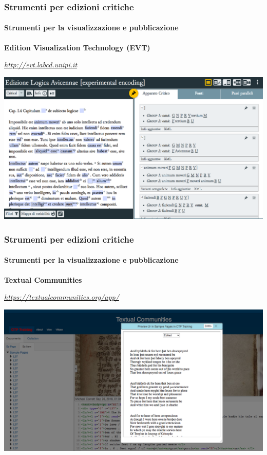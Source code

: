 \begin{frame}
    \frametitle{Strumenti per edizioni critiche}
    \framesubtitle{Strumenti per la visualizzazione e pubblicazione}
	\addtocounter{nframe}{1}
    \begin{center}
        \textbf{Edition Visualization Technology (EVT)}
    \end{center}
    \begin{center}
        \textit{\url{http://evt.labcd.unipi.it}}
	\end{center}
    \begin{center}
        \includegraphics[width=.95\textwidth]{imgs/evt.png}
	\end{center}
\end{frame}

\begin{frame}
    \frametitle{Strumenti per edizioni critiche}
    \framesubtitle{Strumenti per la visualizzazione e pubblicazione}
	\addtocounter{nframe}{1}
    \begin{center}
        \textbf{Textual Communities}
    \end{center}
    \begin{center}
        \textit{\url{https://textualcommunities.org/app/}}
	\end{center}
    \begin{center}
        \includegraphics[width=.95\textwidth]{imgs/textualcommunities.png}
        
	\end{center}
\end{frame}

